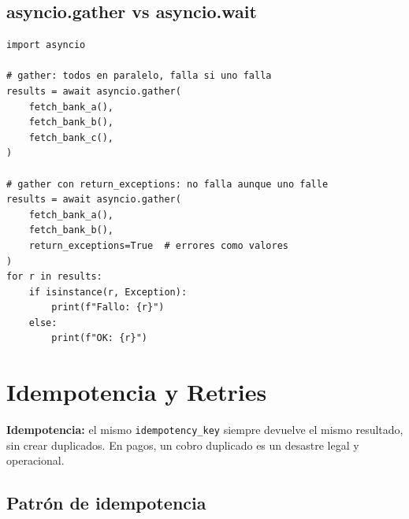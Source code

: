 \documentclass[11pt,a4paper]{article}
\begin{document}
\subsection{asyncio.gather vs asyncio.wait}

\begin{pybox}
\begin{lstlisting}[style=python]
import asyncio

# gather: todos en paralelo, falla si uno falla
results = await asyncio.gather(
    fetch_bank_a(),
    fetch_bank_b(),
    fetch_bank_c(),
)

# gather con return_exceptions: no falla aunque uno falle
results = await asyncio.gather(
    fetch_bank_a(),
    fetch_bank_b(),
    return_exceptions=True  # errores como valores
)
for r in results:
    if isinstance(r, Exception):
        print(f"Fallo: {r}")
    else:
        print(f"OK: {r}")
\end{lstlisting}
\end{pybox}

\section{Idempotencia y Retries}

\begin{keybox}
\textbf{Idempotencia:} el mismo \texttt{idempotency\_key} siempre devuelve el
mismo resultado, sin crear duplicados. En pagos, un cobro duplicado es un
desastre legal y operacional.
\end{keybox}

\subsection{Patrón de idempotencia}
\end{document}
